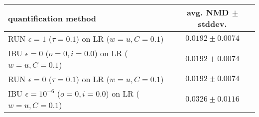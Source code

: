 \begin{tabular}{lc}
  \toprule
  quantification method & avg. NMD $\pm$ stddev. \\
  \midrule
  RUN $\epsilon=1$ ($\tau=0.1$) on LR ($w=u, C=0.1$) & $\mathbf{0.0192 \pm 0.0074}$ \\
  IBU $\epsilon=0$ ($o=0, i=0.0$) on LR ($w=u, C=0.1$) & $0.0192 \pm 0.0074$ \\
  RUN $\epsilon=0$ ($\tau=0.1$) on LR ($w=u, C=0.1$) & $0.0192 \pm 0.0074$ \\
  IBU $\epsilon=10^{-6}$ ($o=0, i=0.0$) on LR ($w=u, C=0.1$) & $0.0326 \pm 0.0116$ \\
  \bottomrule
\end{tabular}
